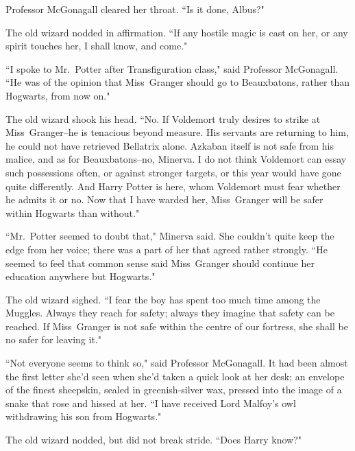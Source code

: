 Professor McGonagall cleared her throat. ``Is it done, Albus?"

The old wizard nodded in affirmation. ``If any hostile magic is cast on her, or any spirit touches her, I shall know, and come."

``I spoke to Mr.~Potter after Transfiguration class," said Professor McGonagall. ``He was of the opinion that Miss~Granger should go to Beauxbatons, rather than Hogwarts, from now on."

The old wizard shook his head. ``No. If Voldemort truly desires to strike at Miss~Granger\---he is tenacious beyond measure. His servants are returning to him, he could not have retrieved Bellatrix alone. Azkaban itself is not safe from his malice, and as for Beauxbatons\---no, Minerva. I do not think Voldemort can essay such possessions often, or against stronger targets, or this year would have gone quite differently. And Harry Potter is here, whom Voldemort must fear whether he admits it or no. Now that I have warded her, Miss~Granger will be safer within Hogwarts than without."

``Mr.~Potter seemed to doubt that," Minerva said. She couldn't quite keep the edge from her voice; there was a part of her that agreed rather strongly. ``He seemed to feel that common sense said Miss~Granger should continue her education anywhere but Hogwarts."

The old wizard sighed. ``I fear the boy has spent too much time among the Muggles. Always they reach for safety; always they imagine that safety can be reached. If Miss~Granger is not safe within the centre of our fortress, she shall be no safer for leaving it."

``Not everyone seems to think so," said Professor McGonagall. It had been almost the first letter she'd seen when she'd taken a quick look at her desk; an envelope of the finest sheepskin, sealed in greenish-silver wax, pressed into the image of a snake that rose and hissed at her. ``I have received Lord Malfoy's owl withdrawing his son from Hogwarts."

The old wizard nodded, but did not break stride. ``Does Harry know?"

